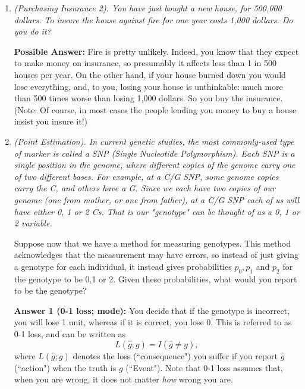 \begin{enumerate}
{\bf Possible Answer: } You know that they must be expecting to make money on the warranty, so you figure
that it is used by fewer than one person in ten. If you buy the warranty, that will cost you 30 dollars.
If you do not buy the warranty, then if your ipod breaks during years 2 or 3 you will have to replace
it. But costs are dropping, and things always get better, so you will presumably spend less than 300
to replace it for something better. So you figure your utility for buying it is -30, and your
utility for not buying it is more than (-300)*0.1 = -30. So you don't buy it.

\medskip

\item {\it (Purchasing Insurance 2). You have just bought a new house, for 500,000 dollars.
To insure the house against fire for one year costs 1,000 dollars. Do you do it?}

{\bf Possible Answer:}  Fire is pretty unlikely. Indeed, you know that they expect to make
money on insurance, so presumably it affects less than 1 in 500 houses per year. On the other
hand, if your house burned down you would lose everything, and, to you, 
losing your house is unthinkable: much more than 500 times worse than losing 1,000 dollars.
So you buy the insurance. (Note: Of course, in most cases the people lending you money to buy a house
insist you insure it!)


\item {\it (Point Estimation). In current genetic studies, the most commonly-used type of marker is called a SNP (Single Nucleotide Polymorphism). Each SNP is a single position in the genome, where different copies of the genome carry one of two different bases. For example, at a C/G SNP, some genome copies carry the C, and others have a G. Since we each have two copies of our genome (one from mother,
or one from father), at a C/G SNP each of us will have either 0, 1 or 2 Cs. That is our "genotype" can be thought of as a 0, 1 or 2 variable.

Suppose now that we have a method for measuring genotypes. This method acknowledges
that the measurement may have errors, so instead of just giving a genotype for each individual,
it instead gives probabilities $p_0,p_1$ and $p_2$ for the genotype to be 0,1 or 2.
Given these probabilities, what would you report to be the genotype?}

{\bf Answer 1 (0-1 loss; mode):} You decide that if the genotype is incorrect, you will lose 1 unit, whereas
if it is correct, you lose 0. This is referred to as 0-1 loss, and can be written as
$$L(\hat{g}; g) = I(\hat{g} \neq g),$$
where $L(\hat{g}; g)$ denotes the loss (``consequence") you suffer if you report $\hat{g}$ (``action")
when the truth is $g$ (``Event"). 
Note that 0-1 loss assumes that, when you are wrong, it does not matter
{\it how} wrong you are. 


\end{enumerate}
